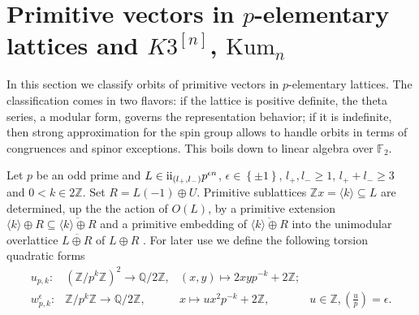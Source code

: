 \documentclass{amsart}
\theoremstyle{definition}
\theoremstyle{plain}
\newcommand{\QQ}{\mathbb{Q}}
\newcommand{\FF}{\mathbb{F}}
\newcommand{\ZZ}{\mathbb{Z}}
\newcommand{\RN}[1]{\textup{\uppercase\expandafter{\romannumeral#1}}}
\newcommand{\even}{\RN{2}}
\newcommand{\leg}[2]{\left( \frac{#1}{#2}\right)}
\newcommand{\kumn}{\mathrm{Kum}_n}
\newcommand{\hskn}{K3^{\left[n\right]}}
\begin{document}
\section{Primitive vectors in \texorpdfstring{$p$}{p}-elementary lattices and \texorpdfstring{$\hskn$, $\kumn$}{K3 n, Kum n}} \label{sec: primitive vectors}
In this section we classify orbits of primitive vectors in $p$-elementary lattices.
The classification comes in two flavors: if the lattice is positive definite, the theta series, a modular form, governs the representation behavior; if it is indefinite, then strong approximation for the spin group allows to handle orbits in terms of congruences and spinor exceptions. This boils down to linear algebra over $\FF_2$.

Let $p$ be an odd prime and $L \in \even_{(l_+,l_-)}p^{\epsilon n}$, $\epsilon \in \left\{\pm 1\right\}$, $l_+, l_- \geq 1$, $l_+ + l_- \geq 3$ and $0<k \in 2\ZZ$.
Set $R=L(-1)\oplus U$. Primitive sublattices
$\ZZ x=\langle k \rangle \subseteq L$ are determined, up the the action of $O(L)$, by
a primitive extension $\langle k \rangle \oplus R \subseteq
\overline{\langle k \rangle \oplus R}$ and
a primitive embedding of
$\overline{\langle k \rangle \oplus R}$
into the unimodular overlattice $\overline{L \oplus R}$ of $L \oplus R$ \cite[Proposition 1.15.1]{nikulin}. For later use we define the following torsion quadratic forms
\[
\begin{array}{lrcc}
u_{p,k}\colon              &(\ZZ/p^k\ZZ)^2 \longrightarrow \QQ/2\ZZ,& (x,y) \mapsto 2xy p^{-k} + 2\ZZ    ;&\\
w_{p,k}^{\epsilon}\colon   & \ZZ/p^k\ZZ    \longrightarrow \QQ/2\ZZ,& x     \mapsto  ux^2p^{-k} +2\ZZ, &u\in \ZZ, \leg{u}{p}=\epsilon.
\end{array}
\]
\end{document}

